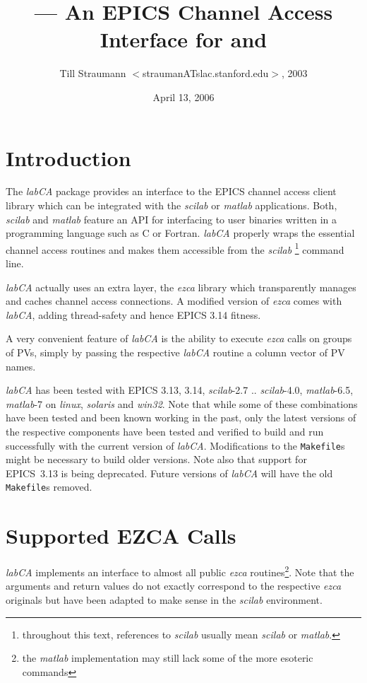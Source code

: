 \documentclass{article}
\title{\sca{} --- An EPICS Channel Access Interface for \scilab{} and \matlab{}}
\author{Till Straumann $<$straumanATslac.stanford.edu$>$, 2003}
\date{April 13, 2006}
\newcommand{\sca}{\ita{labCA}}
\newcommand{\scilab}{\ita{scilab}}
\newcommand{\matlab}{\ita{matlab}}
\newcommand{\windoze}{\ita{win32}}
\newcommand{\ezca}{\ita{ezca}}
\newcommand{\com}[1]{{\tt #1}}
\newcommand{\ita}[1]{\emph{#1}}
\begin{document}
\maketitle
{\hspace*{\fill}{\small\verb$Id: manual.tex,v 1.27 2006/04/12 02:19:35 strauman Exp $}\hspace*{\fill}}
\section{Introduction}
The \sca{} package provides an interface to the
EPICS channel access client library which can be
integrated with the \scilab{} or \matlab{} applications.
Both, \scilab{} and \matlab{} feature an API for interfacing
to user binaries written in a programming language such
as C or Fortran. \sca{} properly wraps the essential
channel access routines and makes them accessible
from the \scilab%
\footnote{throughout this text, references to \scilab{}
usually mean \scilab{} or \matlab.}
command line.

\sca{} actually uses an extra layer, the \ezca{} library
which transparently manages and caches channel access 
connections. A modified version of \ezca{} comes with
\sca, adding thread-safety and hence EPICS 3.14 fitness.

A very convenient feature of \sca{} is the ability
to execute \ezca{} calls on groups of PVs, simply by
passing the respective \sca{} routine a column vector
of PV names.

\sca{} has been tested with EPICS 3.13, 3.14, \scilab-2.7 .. \scilab-4.0,
\matlab-6.5, \matlab-7 on \ita{linux}, \ita{solaris} and
\windoze. Note that while some of these combinations have been
tested and been known working in the past, only the latest
versions of the respective components have been tested
and verified to build and run successfully with the
current version of \sca{}. Modifications to the \com{Makefile}s
might be necessary to build older versions. Note also
that support for EPICS~3.13 is being deprecated. Future
versions of \sca{} will have the old \com{Makefile}s removed.

\section{Supported EZCA Calls}
\sca{} implements an interface to almost all public
\ezca{} routines\footnote{%
the \matlab{} implementation may still lack some of the
more esoteric commands}. Note that the arguments and
return values do not exactly correspond to the respective
\ezca{} originals but have been adapted to make sense
in the  \scilab{} environment.
\end{document}
